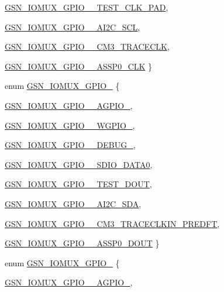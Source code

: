 \begin{DoxyCompactItemize}
\par
\hyperlink{a00519_a959c5ad68f54cc1d3cc77fb390107d74a92a52ca10bfd4ac502ad008488fb5f96}{GSN\_\-IOMUX\_\-GPIO\_\_\-TEST\_\-CLK\_\-PAD}, 
\par
\hyperlink{a00519_a959c5ad68f54cc1d3cc77fb390107d74ac80a54595bbc62d22cff06b693e9d8bf}{GSN\_\-IOMUX\_\-GPIO\_\_\-AI2C\_\-SCL}, 
\par
\hyperlink{a00519_a959c5ad68f54cc1d3cc77fb390107d74abcb5f5e9f59777faea6fe6a8af1a5c02}{GSN\_\-IOMUX\_\-GPIO\_\_\-CM3\_\-TRACECLK}, 
\par
\hyperlink{a00519_a959c5ad68f54cc1d3cc77fb390107d74a142c6ba29beca7ed9e4644c81893875c}{GSN\_\-IOMUX\_\-GPIO\_\_\-ASSP0\_\-CLK}
 \}
\item 
enum \hyperlink{a00519_a7fb289e492a453336f6f5075c2b9745e}{GSN\_\-IOMUX\_\-GPIO\_} \{ \par
\hyperlink{a00519_a7fb289e492a453336f6f5075c2b9745ea966f042c5fd6c32681a8054fe86bd455}{GSN\_\-IOMUX\_\-GPIO\_\_\-AGPIO\_}, 
\par
\hyperlink{a00519_a7fb289e492a453336f6f5075c2b9745eac472517e06f2163f99d3f330c9c4e3f3}{GSN\_\-IOMUX\_\-GPIO\_\_\-WGPIO\_}, 
\par
\hyperlink{a00519_a7fb289e492a453336f6f5075c2b9745eacc66d80e4593f3db5361d318e44b8b90}{GSN\_\-IOMUX\_\-GPIO\_\_\-DEBUG\_}, 
\par
\hyperlink{a00519_a7fb289e492a453336f6f5075c2b9745ea3c6f6da6b5978a1b387fba6f018192a5}{GSN\_\-IOMUX\_\-GPIO\_\_\-SDIO\_\-DATA0}, 
\par
\hyperlink{a00519_a7fb289e492a453336f6f5075c2b9745ead81fca1c6e6b17a1a5ada2d422c8d5e5}{GSN\_\-IOMUX\_\-GPIO\_\_\-TEST\_\-DOUT}, 
\par
\hyperlink{a00519_a7fb289e492a453336f6f5075c2b9745eaaf534af0cb2a0ec5000044411c166d6f}{GSN\_\-IOMUX\_\-GPIO\_\_\-AI2C\_\-SDA}, 
\par
\hyperlink{a00519_a7fb289e492a453336f6f5075c2b9745ea001a33fe6de2f4069a391ac10c4a9233}{GSN\_\-IOMUX\_\-GPIO\_\_\-CM3\_\-TRACECLKIN\_\-PREDFT}, 
\par
\hyperlink{a00519_a7fb289e492a453336f6f5075c2b9745ea7bee5236c5cf76bf688841729058d032}{GSN\_\-IOMUX\_\-GPIO\_\_\-ASSP0\_\-DOUT}
 \}
\item 
enum \hyperlink{a00519_a7ddef78d187dcfeb85d9e19b4d2bd5ac}{GSN\_\-IOMUX\_\-GPIO\_} \{ \par
\hyperlink{a00519_a7ddef78d187dcfeb85d9e19b4d2bd5aca2693dc69eaa9b2eab6997112fcdab3bb}{GSN\_\-IOMUX\_\-GPIO\_\_\-AGPIO\_}, 
\par

\end{DoxyCompactItemize}

